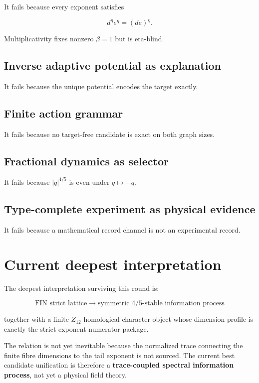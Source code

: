 \documentclass[11pt,a4paper,openany]{report}
\begin{document}
It fails because every exponent satisfies

\[
d^\eta e^\eta=(de)^\eta.
\]

Multiplicativity fixes nonzero \(\beta=1\) but is eta-blind.

\subsection{Inverse adaptive potential as explanation}

It fails because the unique potential encodes the target exactly.

\subsection{Finite action grammar}

It fails because no target-free candidate is exact on both graph sizes.

\subsection{Fractional dynamics as selector}

It fails because \(|q|^{4/5}\) is even under \(q\mapsto-q\).

\subsection{Type-complete experiment as physical evidence}

It fails because a mathematical record channel is not an experimental record.

\section{Current deepest interpretation}

The deepest interpretation surviving this round is:

\[
\boxed{
\text{FIN strict lattice}
\longrightarrow
\text{symmetric }4/5\text{-stable information process}
}
\]

together with a finite \(Z_{12}\) homological-character object whose dimension profile is exactly the strict exponent numerator package.

The relation is not yet inevitable because the normalized trace connecting the finite fibre dimensions to the tail exponent is not sourced. The current best candidate unification is therefore a \textbf{trace-coupled spectral information process}, not yet a physical field theory.
\end{document}
